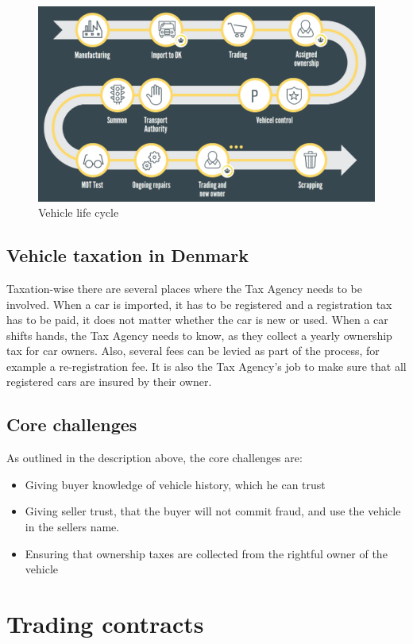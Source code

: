 \documentclass[oneside,a4paper,10pts,article]{memoir}
\begin{document}
\begin{figure}
  \centering
  \includegraphics[width=\textwidth]{lifecycle.png}
  \caption{Vehicle life cycle}
  \label{fig:lifecycle}
\end{figure}

\section{Vehicle taxation in Denmark}
Taxation-wise there are several places where the Tax Agency needs to
be involved. When a car is imported, it has to be registered and a
registration tax has to be paid, it does not matter whether the car is
new or used. When a car shifts hands, the Tax Agency needs to know, as
they collect a yearly ownership tax for car owners. Also, several fees
can be levied as part of the process, for example a re-registration
fee. It is also the Tax Agency's job to make sure that all registered
cars are insured by their owner.

\section{Core challenges}
As outlined in the description above, the core challenges are:

\begin{itemize}
\item Giving buyer knowledge of vehicle history, which he can trust
\item Giving seller trust, that the buyer will not commit fraud, and
  use the vehicle in the sellers name.
\item Ensuring that ownership taxes are collected from the rightful
  owner of the vehicle
\end{itemize}


\chapter{Trading contracts}
\label{sec:trading}
\end{document}

